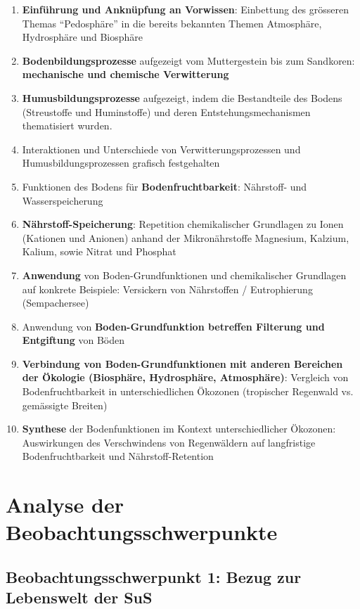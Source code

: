 \begin{enumerate}
  \item \textbf{Einführung und Anknüpfung an Vorwissen}: Einbettung des grösseren Themas \enquote{Pedosphäre} in die bereits bekannten Themen Atmosphäre, Hydrosphäre und Biosphäre
  \item \textbf{Bodenbildungsprozesse} aufgezeigt vom Muttergestein bis zum Sandkoren: \textbf{mechanische und chemische Verwitterung}
  \item \textbf{Humusbildungsprozesse} aufgezeigt, indem die Bestandteile des Bodens (Streustoffe und Huminstoffe) und deren Entstehungsmechanismen thematisiert wurden.
  \item Interaktionen und Unterschiede von Verwitterungsprozessen und Humusbildungsprozessen grafisch festgehalten
  \item Funktionen des Bodens für \textbf{Bodenfruchtbarkeit}: Nährstoff- und Wasserspeicherung
  \item \textbf{Nährstoff-Speicherung}: Repetition chemikalischer Grundlagen zu Ionen (Kationen und Anionen) anhand der Mikronährstoffe Magnesium, Kalzium, Kalium, sowie Nitrat und Phosphat
  \item \textbf{Anwendung }von Boden-Grundfunktionen und chemikalischer Grundlagen auf konkrete Beispiele: Versickern von Nährstoffen / Eutrophierung (Sempachersee)
  \item Anwendung von \textbf{Boden-Grundfunktion betreffen Filterung und Entgiftung} von Böden
  \item \textbf{Verbindung von Boden-Grundfunktionen mit anderen Bereichen der Ökologie (Biosphäre, Hydrosphäre, Atmosphäre)}: Vergleich von Bodenfruchtbarkeit in unterschiedlichen Ökozonen (tropischer Regenwald vs. gemässigte Breiten)
  \item \textbf{Synthese} der Bodenfunktionen im Kontext unterschiedlicher Ökozonen: Auswirkungen des Verschwindens von Regenwäldern auf langfristige Bodenfruchtbarkeit und Nährstoff-Retention
\end{enumerate}

\section{Analyse der Beobachtungsschwerpunkte}
\subsection{Beobachtungsschwerpunkt 1: Bezug zur Lebenswelt der SuS}


